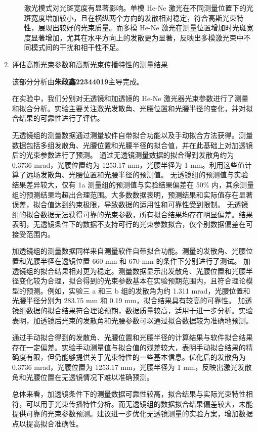 \begin{enumerate}
\begin{itemize}
		激光模式对光斑宽度有显著影响。单模 He-Ne 激光在不同测量位置下的光斑宽度增加较小，且在横纵两个方向的发散相对稳定，符合高斯光束特性，展现出较好的光束质量。而多模 He-Ne 激光在测量位置增加时光斑宽度显著增加，尤其在水平方向上的发散更为显著，反映出多模激光束中不同模式间的干扰和相干性不足。
	\end{itemize}
	
	\item 评估高斯光束参数和高斯光束传播特性的测量结果
	
	该部分分析由\textbf{朱政鑫22344019}主导完成。
	
	在实验中，我们分别对无透镜和加透镜的 He-Ne 激光器光束参数进行了测量和拟合分析。实验主要关注激光发散角、光腰位置和光腰半径的变化，并对拟合结果的可靠性进行了评估。
	
	无透镜组的测量数据通过测量软件自带拟合功能以及手动拟合方法获得。测量数据包括多组发散角、光腰位置和光腰半径的拟合值，并在此基础上对加透镜后的光束参数进行了预测。
	通过无透镜测量数据的拟合得到发散角约为 0.3736 mrad，光腰位置约为 1253.17 mm，光腰半径为 1 mm。利用这些值计算了远场发散角、光腰位置和光腰半径的预测值。
	无透镜组的预测值与实验结果差异较大，仅有 1a 测量组的预测值与实验结果偏差在 50\% 内，其余测量组的预测结果均超出合理范围。大多数数据表明，预测结果和实际值存在显著误差，拟合值达到约束极限，导致数据的适用性和可靠性受到限制。
	无透镜组的拟合数据无法获得可靠的光束参数，所有拟合结果均存在明显偏差。结果表明，无透镜条件下的数据不支持可行的光束参数拟合，仅个别数据偏差在可接受范围内。
	
	加透镜组的测量数据同样来自测量软件自带拟合功能。测量的发散角、光腰位置和光腰半径在透镜位置 660 mm 和 670 mm 的条件下分别进行了测试。
	加透镜组的拟合结果相对更为稳定。测量数据显示出发散角、光腰位置和光腰半径变化较为合理，拟合得到的光束参数基本在实验预期范围内，且符合理论模型的预测。例如，实验三 a 和三 b 组的发散角为约 1.311 mrad，光腰位置和光腰半径分别为 283.75 mm 和 0.19 mm，拟合结果具有较高的可靠性。
	加透镜组数据的拟合结果符合理论预期，数据质量较高，适用于进一步分析。实验表明，加透镜后光束的发散角和光腰参数可以通过拟合数据较为准确地预测。
	
	通过手动拟合得到的发散角、光腰位置和光腰半径的计算结果与软件拟合结果存在一定偏差。实验手动测量值与拟合值的残差较大，表明手动拟合结果的精确度有限，但仍能够提供关于光束特性的一些基本信息。优化后的发散角为 0.3736 mrad，光腰位置为 1253.17 mm，光腰半径为 1 mm，反映出激光发散角和光腰位置在无透镜情况下难以准确预测。
	
	总体来看，加透镜条件下的测量数据可靠性较高，拟合结果与实际光束特性相符，可以用于光束传播特性分析。而无透镜组的数据拟合结果偏差较大，未能提供可靠的光束参数预测。建议进一步优化无透镜测量的实验方案，增加数据点以提高拟合准确性。
	

\end{enumerate}
